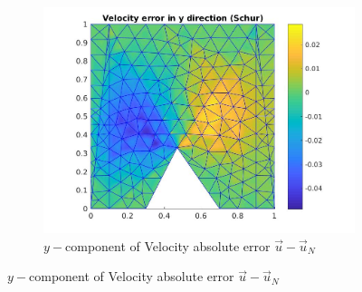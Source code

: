 \documentclass[graybox]{svmult}
\begin{document}
\begin{figure}
\begin{subfigure}{0.31\textwidth}
\includegraphics[width=\linewidth]{velocity_error_2_at_47_33.jpg}
\caption{$y-$component of Velocity absolute error $\overrightarrow{u}-\overrightarrow{u}_N$} \label{error_y_vel}
\end{subfigure}


\end{figure}
\end{document}

